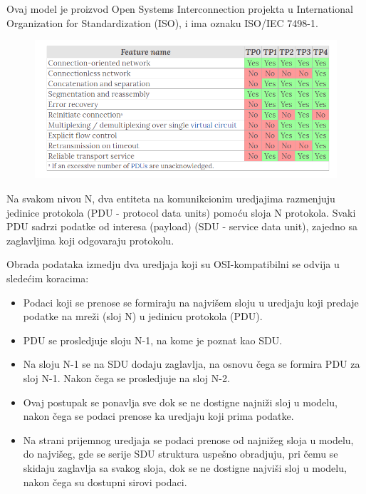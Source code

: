 \documentclass[a4paper,12pt, master]{etf}
\begin{document}
	Ovaj model je proizvod Open Systems Interconnection projekta u
	International Organization for Standardization (ISO), i ima oznaku ISO/IEC
	7498-1.

	\begin{figure}[htb]
			\centering
			\includegraphics[scale=.43]{../pic/tp_classes.png}
			\label{fig:tp_classes}
	\end{figure}

	Na svakom nivou N, dva entiteta na komunikcionim uredjajima razmenjuju
	jedinice protokola (PDU - protocol data units) pomo\'{c}u sloja N
	protokola. Svaki PDU sadrzi podatke od interesa	(payload) (SDU - service
	data unit), zajedno sa zaglavljima koji odgovaraju protokolu.

	Obrada podataka izmedju dva uredjaja koji su OSI-kompatibilni se odvija u
	slede\'{c}im koracima:

	\begin{itemize}
		\item Podaci koji se prenose se formiraju na najvi\v{s}em sloju u
		uredjaju koji predaje podatke na mre\v{z}i (sloj N) u jedinicu
		protokola (PDU).
		\item PDU se prosledjuje sloju N-1, na kome je poznat kao SDU.
		\item Na sloju N-1 se na SDU dodaju zaglavlja, na osnovu \v{c}ega se
		formira PDU za sloj N-1. Nakon \v{c}ega se prosledjuje na sloj N-2.
		\item Ovaj postupak se ponavlja sve dok se ne dostigne najni\v{z}i sloj
		u modelu, nakon	\v{c}ega se podaci prenose ka uredjaju koji prima
		podatke.
		\item Na strani prijemnog uredjaja se podaci prenose od najni\v{z}eg
		sloja u modelu, do najvi\v{s}eg, gde se serije SDU struktura
		uspe\v{s}no obradjuju, pri \v{c}emu se skidaju zaglavlja sa svakog
		sloja, dok se ne dostigne najvi\v{s}i sloj u modelu, nakon \v{c}ega su
		dostupni sirovi podaci.
	\end{itemize}
\end{document}
